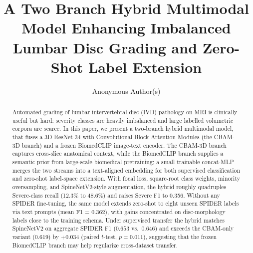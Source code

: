 \documentclass[runningheads]{llncs}
\begin{document}
%
\title{A Two Branch Hybrid Multimodal Model Enhancing Imbalanced Lumbar Disc Grading and Zero-Shot Label Extension}
%
%
%
\author{Anonymous Author(s)}
%
\maketitle
%
\begin{abstract}
Automated grading of lumbar intervertebral disc (IVD) pathology on MRI is clinically useful but hard: severity classes are heavily imbalanced and large labelled volumetric corpora are scarce. In this paper, we present a two-branch hybrid multimodal model, that fuses a 3D ResNet-34 with Convolutional Block Attention Modules (the CBAM-3D branch) and a frozen BiomedCLIP image-text encoder. The CBAM-3D branch captures cross-slice anatomical context, while the BiomedCLIP branch supplies a semantic prior from large-scale biomedical pretraining; a small trainable concat-MLP merges the two streams into a text-aligned embedding for both supervised classification and zero-shot label-space extension. With focal loss, square-root class weights, minority oversampling, and SpineNetV2-style augmentation, the hybrid roughly quadruples Severe-class recall (12.3\% to 48.6\%) and raises Severe F1 to 0.356. Without any SPIDER fine-tuning, the same model extends zero-shot to eight unseen SPIDER labels via text prompts (mean F1 = 0.362), with gains concentrated on disc-morphology labels close to the training schema. Under supervised transfer the hybrid matches SpineNetV2 on aggregate SPIDER F1 ($0.653$ vs.\ $0.646$) and exceeds the CBAM-only variant ($0.619$) by $+0.034$ (paired $t$-test, $p=0.011$), suggesting that the frozen BiomedCLIP branch may help regularize cross-dataset transfer.

\end{abstract}
%
\end{document}

